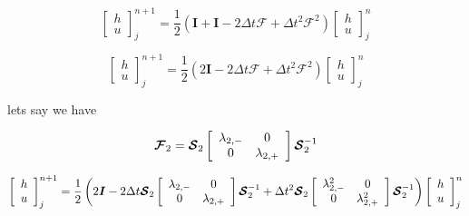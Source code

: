 \documentclass[12pt]{article}
\begin{document}
\[\left[\begin{array}{c}
h \\ u
\end{array}\right]^{n+1}_j = \frac{1}{2} \left(\boldsymbol{I} +  \boldsymbol{I} -2\Delta t\boldsymbol{\mathcal{F}} + \Delta t^2\boldsymbol{\mathcal{F}}^2 \right) \left[\begin{array}{c}
h \\ u
\end{array}\right]^{n}_j  \]

\[\left[\begin{array}{c}
h \\ u
\end{array}\right]^{n+1}_j = \frac{1}{2} \left(2\boldsymbol{I}  -2\Delta t\boldsymbol{\mathcal{F}} + \Delta t^2\boldsymbol{\mathcal{F}}^2 \right) \left[\begin{array}{c}
h \\ u
\end{array}\right]^{n}_j  \]

lets say we have 

\[\boldsymbol{\mathcal{F}}_2 = \boldsymbol{\mathcal{S}}_2 \left[\begin{array}{c c}
\lambda_{2,-}  & 0 \\0  & \lambda_{2,+}
\end{array}\right] \boldsymbol{\mathcal{S}}_2^{-1}  \]

\[\left[\begin{array}{c}
h \\ u
\end{array}\right]^{n+1}_j = \frac{1}{2} \left(2\boldsymbol{I}  -2\Delta t\boldsymbol{\mathcal{S}}_2 \left[\begin{array}{c c}
\lambda_{2,-}  & 0 \\0  & \lambda_{2,+}
\end{array}\right] \boldsymbol{\mathcal{S}}_2^{-1} + \Delta t^2\boldsymbol{\mathcal{S}}_2 \left[\begin{array}{c c}
\lambda_{2,-}^2  & 0 \\0  & \lambda_{2,+}^2
\end{array}\right] \boldsymbol{\mathcal{S}}_2^{-1} \right) \left[\begin{array}{c}
h \\ u
\end{array}\right]^{n}_j  \]
\end{document}
